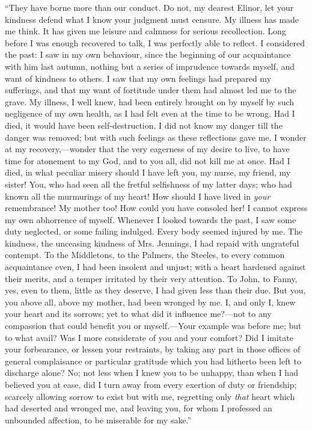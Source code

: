 

“They have borne more than our conduct. Do not, my dearest Elinor, let your kindness defend what I know your judgment must censure. My illness has made me think. It has given me leisure and calmness for serious recollection. Long before I was enough recovered to talk, I was perfectly able to reflect. I considered the past: I saw in my own behaviour, since the beginning of our acquaintance with him last autumn, nothing but a series of imprudence towards myself, and want of kindness to others. I saw that my own feelings had prepared my sufferings, and that my want of fortitude under them had almost led me to the grave. My illness, I well knew, had been entirely brought on by myself by such negligence of my own health, as I had felt even at the time to be wrong. Had I died, it would have been self-destruction. I did not know my danger till the danger was removed; but with such feelings as these reflections gave me, I wonder at my recovery,---wonder that the very eagerness of my desire to live, to have time for atonement to my God, and to you all, did not kill me at once. Had I died, in what peculiar misery should I have left you, my nurse, my friend, my sister! You, who had seen all the fretful selfishness of my latter days; who had known all the murmurings of my heart! How should I have lived in {\em your} remembrance! My mother too! How could you have consoled her! I cannot express my own abhorrence of myself. Whenever I looked towards the past, I saw some duty neglected, or some failing indulged. Every body seemed injured by me. The kindness, the unceasing kindness of Mrs. Jennings, I had repaid with ungrateful contempt. To the Middletons, to the Palmers, the Steeles, to every common acquaintance even, I had been insolent and unjust; with a heart hardened against their merits, and a temper irritated by their very attention. To John, to Fanny, yes, even to them, little as they deserve, I had given less than their due. But you, you above all, above my mother, had been wronged by me. I, and only I, knew your heart and its sorrows; yet to what did it influence me?---not to any compassion that could benefit you or myself.---Your example was before me; but to what avail? Was I more considerate of you and your comfort? Did I imitate your forbearance, or lessen your restraints, by taking any part in those offices of general complaisance or particular gratitude which you had hitherto been left to discharge alone? No; not less when I knew you to be unhappy, than when I had believed you at ease, did I turn away from every exertion of duty or friendship; scarcely allowing sorrow to exist but with me, regretting only {\em that} heart which had deserted and wronged me, and leaving you, for whom I professed an unbounded affection, to be miserable for my sake.”

